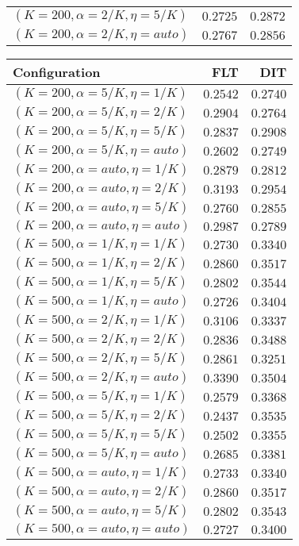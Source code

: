 \begin{table}
\begin{spacing}{1.2}
{\begin{tabular}{lrr}
   $(K=200,\alpha=2/K,\eta=5/K)$ & $0.2725$ & $0.2872$ \\
  $(K=200,\alpha=2/K,\eta=auto)$ & $0.2767$ & $0.2856$ \\
\bottomrule
\end{tabular}
} \hfill \parbox{.45\linewidth}{\centering \begin{tabular}{lrr}
\toprule
                   Configuration &           FLT &           DIT \\
\midrule
   $(K=200,\alpha=5/K,\eta=1/K)$ &      $0.2542$ &      $0.2740$ \\
   $(K=200,\alpha=5/K,\eta=2/K)$ &      $0.2904$ &      $0.2764$ \\
   $(K=200,\alpha=5/K,\eta=5/K)$ &      $0.2837$ &      $0.2908$ \\
  $(K=200,\alpha=5/K,\eta=auto)$ &      $0.2602$ &      $0.2749$ \\
  $(K=200,\alpha=auto,\eta=1/K)$ &      $0.2879$ &      $0.2812$ \\
  $(K=200,\alpha=auto,\eta=2/K)$ &      $0.3193$ &      $0.2954$ \\
  $(K=200,\alpha=auto,\eta=5/K)$ &      $0.2760$ &      $0.2855$ \\
 $(K=200,\alpha=auto,\eta=auto)$ &      $0.2987$ &      $0.2789$ \\
   $(K=500,\alpha=1/K,\eta=1/K)$ &      $0.2730$ &      $0.3340$ \\
   $(K=500,\alpha=1/K,\eta=2/K)$ &      $0.2860$ &      $0.3517$ \\
   $(K=500,\alpha=1/K,\eta=5/K)$ &      $0.2802$ & $\bm{0.3544}$ \\
  $(K=500,\alpha=1/K,\eta=auto)$ &      $0.2726$ &      $0.3404$ \\
   $(K=500,\alpha=2/K,\eta=1/K)$ &      $0.3106$ &      $0.3337$ \\
   $(K=500,\alpha=2/K,\eta=2/K)$ &      $0.2836$ &      $0.3488$ \\
   $(K=500,\alpha=2/K,\eta=5/K)$ &      $0.2861$ &      $0.3251$ \\
  $(K=500,\alpha=2/K,\eta=auto)$ & $\bm{0.3390}$ &      $0.3504$ \\
   $(K=500,\alpha=5/K,\eta=1/K)$ &      $0.2579$ &      $0.3368$ \\
   $(K=500,\alpha=5/K,\eta=2/K)$ &      $0.2437$ &      $0.3535$ \\
   $(K=500,\alpha=5/K,\eta=5/K)$ &      $0.2502$ &      $0.3355$ \\
  $(K=500,\alpha=5/K,\eta=auto)$ &      $0.2685$ &      $0.3381$ \\
  $(K=500,\alpha=auto,\eta=1/K)$ &      $0.2733$ &      $0.3340$ \\
  $(K=500,\alpha=auto,\eta=2/K)$ &      $0.2860$ &      $0.3517$ \\
  $(K=500,\alpha=auto,\eta=5/K)$ &      $0.2802$ &      $0.3543$ \\
 $(K=500,\alpha=auto,\eta=auto)$ &      $0.2727$ &      $0.3400$ \\
\bottomrule
\end{tabular}
}
\end{spacing}
\end{table}
